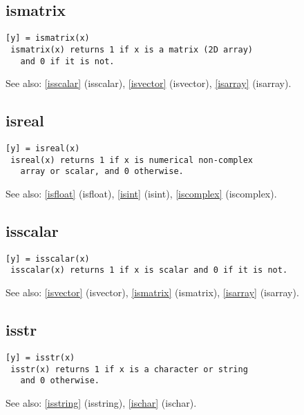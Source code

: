 \documentclass[a4paper]{article}
\begin{document}
\subsection{ismatrix\label{ismatrix}}

\begin{tscreen}
\begin{verbatim}
[y] = ismatrix(x)
 ismatrix(x) returns 1 if x is a matrix (2D array)
   and 0 if it is not.
\end{verbatim}

See also: \ref{isscalar} {(isscalar)}, \ref{isvector} {(isvector)}, \ref{isarray} {(isarray)}.
\end{tscreen}



\subsection{isreal\label{isreal}}

\begin{tscreen}
\begin{verbatim}
[y] = isreal(x)
 isreal(x) returns 1 if x is numerical non-complex
   array or scalar, and 0 otherwise.
\end{verbatim}

See also: \ref{isfloat} {(isfloat)}, \ref{isint} {(isint)}, \ref{iscomplex} {(iscomplex)}.
\end{tscreen}



\subsection{isscalar\label{isscalar}}

\begin{tscreen}
\begin{verbatim}
[y] = isscalar(x)
 isscalar(x) returns 1 if x is scalar and 0 if it is not.
\end{verbatim}

See also: \ref{isvector} {(isvector)}, \ref{ismatrix} {(ismatrix)}, \ref{isarray} {(isarray)}.
\end{tscreen}



\subsection{isstr\label{isstr}}

\begin{tscreen}
\begin{verbatim}
[y] = isstr(x)
 isstr(x) returns 1 if x is a character or string
   and 0 otherwise.
\end{verbatim}

See also: \ref{isstring} {(isstring)}, \ref{ischar} {(ischar)}.
\end{tscreen}
\end{document}
